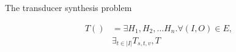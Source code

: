 \documentclass{article}
\begin{document}
The transducer synthesis problem

\begin{align*}
T() &= \exists H_1, H_2, \ldots H_n . \forall (I, O) \in E, \\
& \exists_{t \in |I|} T_{s,t,v}, T_{} 
\end{align*}
\end{document}
